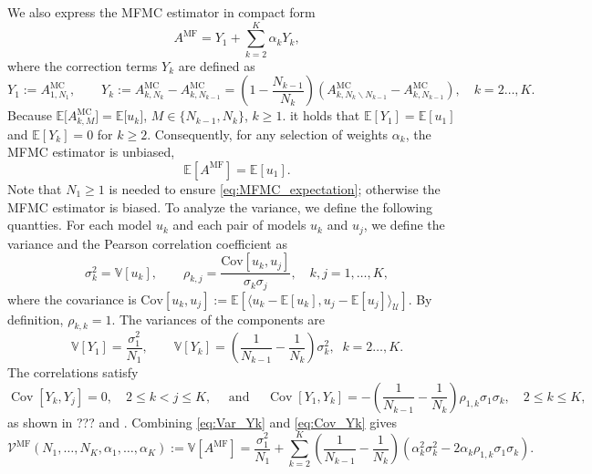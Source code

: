 We also express the MFMC estimator in compact form
\begin{equation*}\label{eq:MFMC_estimator_Correction}
          A^{\text{MF}} = Y_1 + \sum_{k=2}^K \alpha_k Y_k,
\end{equation*}
where the correction terms $Y_k$ are defined as
\begin{equation} \label{eq:MFMC_Yk}
       Y_1 := A^{\text{MC}}_{1,N_1},\qquad 
       Y_k := A^{\text{MC}}_{k,N_k} - A^{\text{MC}}_{k,N_{k-1}}
               =\left(1-\frac{N_{k-1}}{N_k}\right)
                 \left(A_{k,N_k\backslash N_{k-1}}^{\text{MC}}-A_{k,N_{k-1}}^{\text{MC}}\right), \quad k=2\ldots, K.
\end{equation}
%
Because $\mathbb{E}\big[ A^{\text{MC}}_{k,M} \big] = \mathbb{E}\big[ u_k\big]$, $M \in \{ N_{k-1}, N_k \}$, $k\ge 1$.
it holds that  $\mathbb{E}[Y_1] =  \mathbb{E}[u_1]$ and  
$\mathbb{E}[Y_k] = 0$ for $k\ge 2$.
Consequently, for any selection of weights $\alpha_k$, 
the MFMC estimator is  unbiased, 
\begin{equation}\label{eq:MFMC_expectation}
            \mathbb{E}[A^{\text{MF}}] =  \mathbb{E}[u_1].
\end{equation}
Note that $N_1 \ge 1$ is needed to ensure \eqref{eq:MFMC_expectation}; otherwise the MFMC estimator
is biased.
To analyze the variance, we define the following quantties.
For each model $u_k$  and each pair of models $u_k$ and $u_j$, 
we define the variance and the Pearson correlation coefficient as
\begin{equation*}
    \sigma_k^2 = \mathbb{V}\left[u_k\right],\qquad \rho_{k,j} 
                       = \frac{\text{Cov}\left[ u_k, u_j\right]}{\sigma_k\sigma_j}, \quad k,j=1,\dots, K,
\end{equation*}
where the covariance is 
$\text{Cov}[u_k, u_j] := \mathbb{E}[\langle u_k - \mathbb{E}[u_k], u_j - \mathbb{E}[u_j]\rangle_{{\mathcal U}}]$.
By definition, $\rho_{k,k}=1$. 
The variances of the components are
\begin{equation}\label{eq:Var_Yk}
    \mathbb{V}[Y_1] = \frac{\sigma_1^2}{N_1}, \qquad 
    \mathbb{V}[Y_k] = \left(\frac{1}{N_{k-1}} - \frac{1}{N_k}\right)\sigma_k^2, \;\; k=2\ldots, K.
\end{equation}
The correlations satisfy
\begin{equation}\label{eq:Cov_Yk}
\operatorname{Cov} [Y_k,Y_j ]=0, \quad  2\le k<j\le K, 
\quad \mbox{ and } \quad
\operatorname{Cov}[Y_1,Y_k] = -\!\left(\frac{1}{N_{k-1}} - \frac{1}{N_k}\right)\rho_{1,k}\sigma_1\sigma_k,
\quad  2\le k \le K, 
\end{equation}
as shown in ??? and \cite[Lemma~3.2]{BPeherstorfer_KWillcox_MDGunzburger_2016a}. 
Combining \eqref{eq:Var_Yk} and \eqref{eq:Cov_Yk} gives
%
\begin{equation}\label{eq:MFMC_variance0}
    \mathcal{V}^{\text{MF}}(N_1, \ldots, N_K, \alpha_1, \ldots, \alpha_K)
    :=  \mathbb{V}[A^{\text{MF}}]
    =\frac{\sigma_1^2}{N_1} 
    + \sum_{k=2}^K \left(\frac{1}{N_{k-1}} - \frac{1}{N_k}\right)\!\left(\alpha_k^2\sigma_k^2 - 2\alpha_k\rho_{1,k}\sigma_1\sigma_k\right).
\end{equation}

